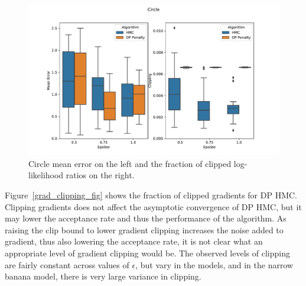 \documentclass[english,twoside,openright]{HYgraduMLDS}
\begin{document}
\begin{figure}
  \centering
  \includegraphics[width=\textwidth]{figures/circle}
  \caption{
    Circle mean error on the left and the fraction of clipped log-likelihood
    ratios on the right.
  }
  \label{circle_fig}
\end{figure}

Figure~\ref{grad_clipping_fig} shows the fraction of clipped
gradients for DP HMC. Clipping gradients does not affect the asymptotic
convergence of DP HMC, but it may lower the acceptance rate and thus
the performance of the algorithm. As raising the clip bound to lower
gradient clipping increases the noise added to gradient, thus also lowering
the acceptance rate, it is not clear what an appropriate level of gradient
clipping would be. The observed levels of clipping are fairly constant across
values of \(\epsilon\), but vary in the models, and in the narrow banana model,
there is very large variance in clipping.
\end{document}
